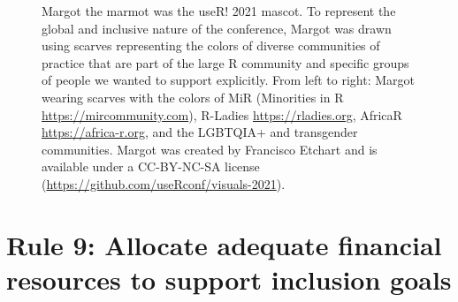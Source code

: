 \documentclass[10pt,letterpaper]{article}
\begin{document}
\begin{figure}[!h]
\centering
{}
\caption{Margot the marmot was the useR! 2021 mascot. To represent the global and inclusive nature of the conference, Margot was drawn using scarves representing the colors of diverse communities of practice that are part of the large R community and specific groups of people we wanted to support explicitly. From left to right: Margot wearing scarves with the colors of MiR (Minorities in R \url{https://mircommunity.com}), R-Ladies \url{https://rladies.org}, AfricaR \url{https://africa-r.org}, and the LGBTQIA+ and transgender communities. Margot was created by Francisco Etchart and is available under a CC-BY-NC-SA license (\url{https://github.com/useRconf/visuals-2021}).}
\label{fig:marmots}
\end{figure}

\section*{Rule 9: Allocate adequate financial resources to support inclusion goals}
\label{rule_financial}
\end{document}
